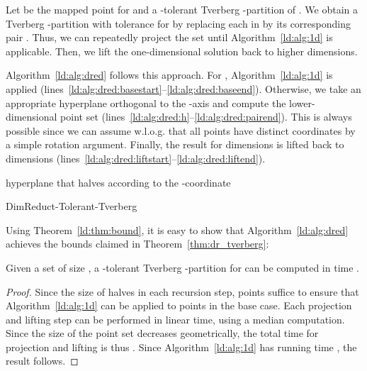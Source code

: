 \documentclass[oribibl,envcountsame,envcountsect]{llncs}
\newenvironment{alg}{
  \begin{algorithm}[htbp]
    \SetKwInOut{Input}{input}
    \SetKwInOut{Output}{output}
  }{
  \end{algorithm}
}
\begin{document}
Let  be the mapped point for  and
 a
-tolerant Tverberg -partition of .
We obtain a Tverberg -partition  with tolerance  for
 by replacing each  in  by its corresponding pair
. Thus, we can repeatedly project the set 
until Algorithm~\ref{ld:alg:1d} is applicable. Then, we lift the one-dimensional
solution back to higher dimensions.

Algorithm~\ref{ld:alg:dred} follows this approach.
For , Algorithm~\ref{ld:alg:1d} is applied
(lines~\ref{ld:alg:dred:basestart}--\ref{ld:alg:dred:baseend}).
Otherwise, we take an appropriate hyperplane orthogonal to the -axis and
compute the lower-dimensional point set
(lines~\ref{ld:alg:dred:h}--\ref{ld:alg:dred:pairend}). This is always possible
since we can assume w.l.o.g.
that all points have distinct  coordinates by a simple rotation argument.
Finally, the result for  dimensions is lifted back to  dimensions
(lines~\ref{ld:alg:dred:liftstart}--\ref{ld:alg:dred:liftend}).
\begin{alg}
  \If{}{\label{ld:alg:dred:basestart}
    \Return{\solveOned}
    \label{ld:alg:dred:baseend}
  }
   hyperplane that halves  according to the -coordinate\;
  \label{ld:alg:dred:h}
  \;
  \;
  \label{ld:alg:dred:reccall}
  \ForEach{}{
    \label{ld:alg:dred:liftstart}
    \;
    \label{ld:alg:dred:liftend}
  }
  \label{ld:alg:dred:return}
  \Return{}\;
  \caption{DimReduct-Tolerant-Tverberg}
  \label{ld:alg:dred}
\end{alg}
Using Theorem~\ref{ld:thm:bound}, it is easy to show that
Algorithm~\ref{ld:alg:dred} achieves the bounds claimed in Theorem~\ref{thm:dr_tverberg}:
\begin{theorem}
  Given a set  of size ,
  a -tolerant Tverberg -partition
  for  can be computed in time .
\end{theorem}
\begin{proof}
  Since the size of  halves in each recursion step,  points
  suffice to ensure that Algorithm~\ref{ld:alg:1d} can be applied to 
  points in the base case. Each projection and lifting step can be performed in linear
  time, using a median computation. Since the size of the point set decreases
  geometrically, the total time for projection and lifting is thus .
  Since Algorithm~\ref{ld:alg:1d} has running time , the result follows.
\end{proof}
\end{document}
